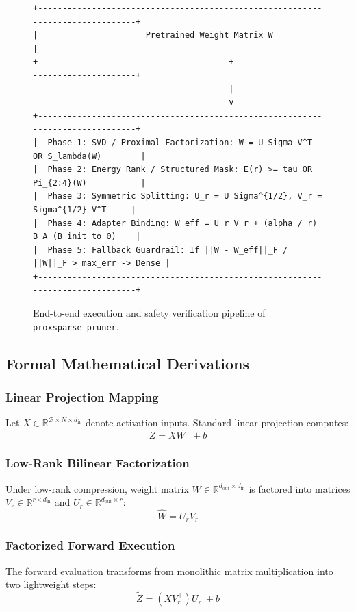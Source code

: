 \begin{figure}[t]
\centering
\begin{verbatim}
+-------------------------------------------------------------------------------+
|                      Pretrained Weight Matrix W                               |
+---------------------------------------+---------------------------------------+
                                        |
                                        v
+-------------------------------------------------------------------------------+
|  Phase 1: SVD / Proximal Factorization: W = U Sigma V^T OR S_lambda(W)        |
|  Phase 2: Energy Rank / Structured Mask: E(r) >= tau OR Pi_{2:4}(W)           |
|  Phase 3: Symmetric Splitting: U_r = U Sigma^{1/2}, V_r = Sigma^{1/2} V^T     |
|  Phase 4: Adapter Binding: W_eff = U_r V_r + (alpha / r) B A (B init to 0)    |
|  Phase 5: Fallback Guardrail: If ||W - W_eff||_F / ||W||_F > max_err -> Dense |
+-------------------------------------------------------------------------------+
\end{verbatim}
\caption{End-to-end execution and safety verification pipeline of \texttt{proxsparse\_pruner}.}
\end{figure}

\subsection{Formal Mathematical Derivations}

\subsubsection{Linear Projection Mapping}
Let $X \in \mathbb{R}^{\mathcal{B} \times N \times d_{\text{in}}}$ denote activation inputs. Standard linear projection computes:
\[
Z = X W^\top + b
\]

\subsubsection{Low-Rank Bilinear Factorization}
Under low-rank compression, weight matrix $W \in \mathbb{R}^{d_{\text{out}} \times d_{\text{in}}}$ is factored into matrices $V_r \in \mathbb{R}^{r \times d_{\text{in}}}$ and $U_r \in \mathbb{R}^{d_{\text{out}} \times r}$:
\[
\hat{W} = U_r V_r
\]

\subsubsection{Factorized Forward Execution}
The forward evaluation transforms from monolithic matrix multiplication into two lightweight steps:
\[
\tilde{Z} = (X V_r^\top) U_r^\top + b
\]

